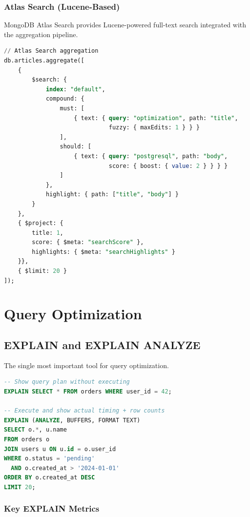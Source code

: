 \documentclass[12pt,a4paper]{article}
\begin{document}
\subsubsection{Atlas Search (Lucene-Based)}

MongoDB Atlas Search provides Lucene-powered full-text search integrated with the aggregation pipeline.

\begin{lstlisting}[language=SQL, caption={Atlas Search}]
// Atlas Search aggregation
db.articles.aggregate([
    {
        $search: {
            index: "default",
            compound: {
                must: [
                    { text: { query: "optimization", path: "title",
                              fuzzy: { maxEdits: 1 } } }
                ],
                should: [
                    { text: { query: "postgresql", path: "body",
                              score: { boost: { value: 2 } } } }
                ]
            },
            highlight: { path: ["title", "body"] }
        }
    },
    { $project: {
        title: 1,
        score: { $meta: "searchScore" },
        highlights: { $meta: "searchHighlights" }
    }},
    { $limit: 20 }
]);
\end{lstlisting}


\section{Query Optimization}

\subsection{EXPLAIN and EXPLAIN ANALYZE}

The single most important tool for query optimization.

\begin{lstlisting}[language=SQL, caption={EXPLAIN usage}]
-- Show query plan without executing
EXPLAIN SELECT * FROM orders WHERE user_id = 42;

-- Execute and show actual timing + row counts
EXPLAIN (ANALYZE, BUFFERS, FORMAT TEXT)
SELECT o.*, u.name
FROM orders o
JOIN users u ON u.id = o.user_id
WHERE o.status = 'pending'
  AND o.created_at > '2024-01-01'
ORDER BY o.created_at DESC
LIMIT 20;
\end{lstlisting}

\subsubsection{Key EXPLAIN Metrics}
\end{document}
